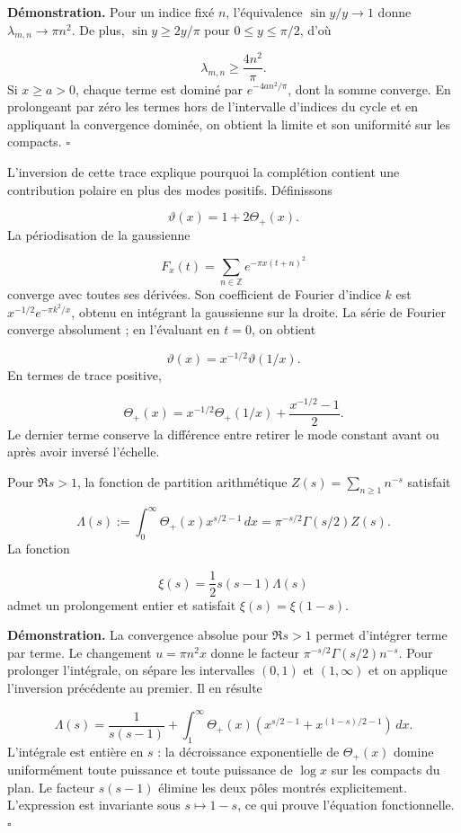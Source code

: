 \textbf{Démonstration.} Pour un indice fixé \(n\), l'équivalence \(\sin y/y\to1\) donne \(\lambda_{m,n}\to\pi n^2\). De plus, \(\sin y\geq2y/\pi\) pour \(0\leq y\leq\pi/2\), d'où

\[
\lambda_{m,n}\geq\frac{4n^2}{\pi}.
\]
Si \(x\geq a>0\), chaque terme est dominé par \(e^{-4an^2/\pi}\), dont la somme converge. En prolongeant par zéro les termes hors de l’intervalle d’indices du cycle et en appliquant la convergence dominée, on obtient la limite et son uniformité sur les compacts. \hfill\(\square\)

L'inversion de cette trace explique pourquoi la complétion contient une contribution polaire en plus des modes positifs. Définissons

\[
\vartheta(x)=1+2\Theta_+(x).
\]
La périodisation de la gaussienne

\[
F_x(t)=\sum_{n\in\mathbb Z}e^{-\pi x(t+n)^2}
\]
converge avec toutes ses dérivées. Son coefficient de Fourier d'indice \(k\) est \(x^{-1/2}e^{-\pi k^2/x}\), obtenu en intégrant la gaussienne sur la droite. La série de Fourier converge absolument ; en l'évaluant en \(t=0\), on obtient

\[
\vartheta(x)=x^{-1/2}\vartheta(1/x).
\]
En termes de trace positive,

\[
\Theta_+(x)=x^{-1/2}\Theta_+(1/x)+\frac{x^{-1/2}-1}{2}.
\]
Le dernier terme conserve la différence entre retirer le mode constant avant ou après avoir inversé l’échelle.

Pour \(\Re s>1\), la fonction de partition arithmétique \(Z(s)=\sum_{n\geq1}n^{-s}\) satisfait

\[
\Lambda(s):=\int_0^\infty\Theta_+(x)x^{s/2-1}\,dx
=\pi^{-s/2}\Gamma(s/2)Z(s).
\]
La fonction

\[
\xi(s)=\frac12s(s-1)\Lambda(s)
\]
admet un prolongement entier et satisfait \(\xi(s)=\xi(1-s)\).

\textbf{Démonstration.} La convergence absolue pour \(\Re s>1\) permet d'intégrer terme par terme. Le changement \(u=\pi n^2x\) donne le facteur \(\pi^{-s/2}\Gamma(s/2)n^{-s}\). Pour prolonger l'intégrale, on sépare les intervalles \((0,1)\) et \((1,\infty)\) et on applique l'inversion précédente au premier. Il en résulte

\[
\Lambda(s)=\frac1{s(s-1)}
+\int_1^\infty\Theta_+(x)
\left(x^{s/2-1}+x^{(1-s)/2-1}\right)\,dx.
\]
L’intégrale est entière en \(s\) : la décroissance exponentielle de \(\Theta_+(x)\) domine uniformément toute puissance et toute puissance de \(\log x\) sur les compacts du plan. Le facteur \(s(s-1)\) élimine les deux pôles montrés explicitement. L’expression est invariante sous \(s\mapsto1-s\), ce qui prouve l’équation fonctionnelle. \hfill\(\square\)


